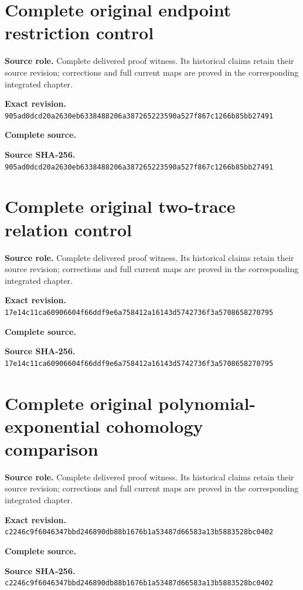 \begingroup
\sloppy
\small
\clearpage
\section{Complete original endpoint restriction control}
\noindent\textbf{Source role.} Complete delivered proof witness. Its historical claims retain their source revision; corrections and full current maps are proved in the corresponding integrated chapter.\par
\noindent\textbf{Exact revision.} \nolinkurl{905ad0dcd20a2630eb6338488206a387265223590a527f867c1266b85bb27491}\par
\noindent\textbf{Complete source.} \par
\noindent\textbf{Source SHA-256.} \nolinkurl{905ad0dcd20a2630eb6338488206a387265223590a527f867c1266b85bb27491}\par\medskip

\endgroup

\begingroup
\sloppy
\small
\clearpage
\section{Complete original two-trace relation control}
\noindent\textbf{Source role.} Complete delivered proof witness. Its historical claims retain their source revision; corrections and full current maps are proved in the corresponding integrated chapter.\par
\noindent\textbf{Exact revision.} \nolinkurl{17e14c11ca60906604f66ddf9e6a758412a16143d5742736f3a5708658270795}\par
\noindent\textbf{Complete source.} \par
\noindent\textbf{Source SHA-256.} \nolinkurl{17e14c11ca60906604f66ddf9e6a758412a16143d5742736f3a5708658270795}\par\medskip

\endgroup

\begingroup
\sloppy
\small
\clearpage
\section{Complete original polynomial-exponential cohomology comparison}
\noindent\textbf{Source role.} Complete delivered proof witness. Its historical claims retain their source revision; corrections and full current maps are proved in the corresponding integrated chapter.\par
\noindent\textbf{Exact revision.} \nolinkurl{c2246c9f6046347bbd246890db88b1676b1a53487d66583a13b5883528bc0402}\par
\noindent\textbf{Complete source.} \par
\noindent\textbf{Source SHA-256.} \nolinkurl{c2246c9f6046347bbd246890db88b1676b1a53487d66583a13b5883528bc0402}\par\medskip

\endgroup

